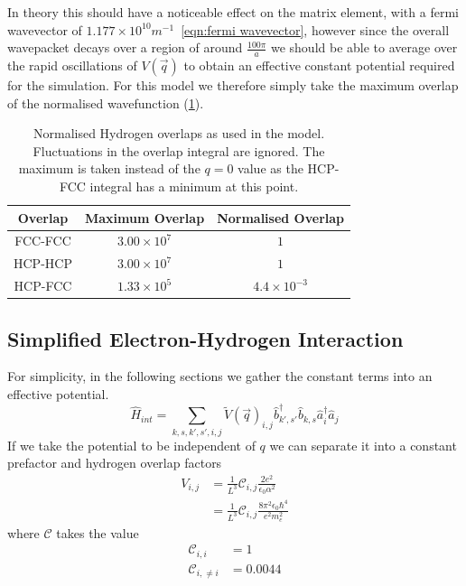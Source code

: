 In theory this should have a noticeable
effect on the matrix element, with a
fermi wavevector of
\(1.177\times{}10^{10} m^{-1}\)~\cref{eqn:fermi wavevector},
however since the overall wavepacket decays over a region
of around \(\frac{100\pi}{a}\) we should be
able to average over the rapid oscillations of
\(V(\vec{q})\) to obtain an effective constant
potential required for the simulation. For this
model we therefore simply take the maximum overlap
of the normalised wavefunction (\cref{tab:hydrogen overlaps}).
\begin{table}[htbp]
    \begin{center}
        \begin{tabular}{ *{3}{c} }
            \toprule
            Overlap & Maximum Overlap        & Normalised Overlap     \\
            \midrule
            FCC-FCC & \(3.00\times{}10^{7}\) & \(1\)                  \\
            HCP-HCP & \(3.00\times{}10^{7}\) & \(1\)                  \\
            HCP-FCC & \(1.33\times{}10^{5}\) & \(4.4\times{}10^{-3}\) \\
            \bottomrule
        \end{tabular}
    \end{center}
    \caption{Normalised Hydrogen overlaps as used in the
        model. Fluctuations in the overlap
        integral are ignored. The maximum
        is taken instead of the \(q=0\) value as the HCP-FCC integral
        has a minimum at this point.}\label{tab:hydrogen overlaps}
\end{table}

\subsection{Simplified Electron-Hydrogen Interaction
}\label{sec:simplified interaction}
For simplicity, in the following sections
we gather the constant terms into
an effective potential.
\begin{equation}
    \hat{H}_{int} = \sum_{k,s,k',s',i,j}
    {\tilde{V}(\vec{q})}_{i,j}
    \hat{b}^\dagger_{k',s'}\hat{b}_{k,s}
    \hat{a}^\dagger_{i}\hat{a}_{j}
    \label{eqn:interaction hamiltonian in k}
\end{equation}
If we take the potential to be independent
of \(q\) we can separate it
into a constant prefactor
and hydrogen overlap factors
\begin{align}
    V_{i,j}
     & =
    \frac{1}{L^3}
    \mathcal{C}_{i,j}
    \frac{2e^2}{\epsilon_0 \alpha^2} \\
     & =
    \frac{1}{L^3}
    \mathcal{C}_{i,j}
    \frac{8 \pi^2 \epsilon_0 \hbar^4}{e^2 m_e^2}
    \label{eqn:simplified interacton potential}
\end{align}
where \(\mathcal{C}\) takes
the value
\begin{align}
    \mathcal{C}_{i, i}      & = 1      \\
    \mathcal{C}_{i, \neq i} & = 0.0044
\end{align}

